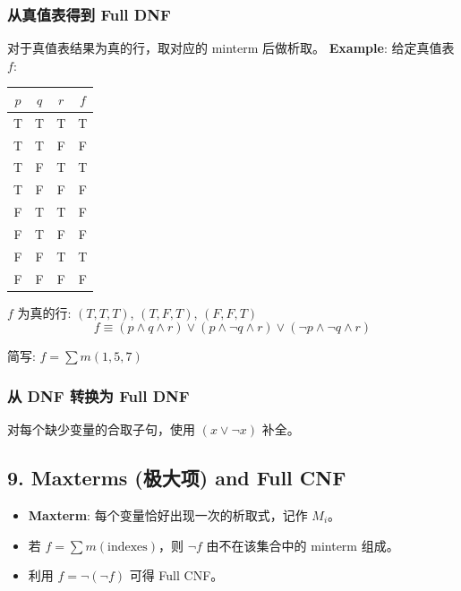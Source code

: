 \documentclass[10pt,a4paper,openany]{ctexbook}
\theoremstyle{definition}
\theoremstyle{remark}
\begin{document}
\subsubsection{从真值表得到 Full DNF}

对于真值表结果为真的行，取对应的 minterm 后做析取。
\textbf{Example}: 给定真值表 $f$:
\begin{center}
\begin{tabular}{cccc}
\hline
$p$ & $q$ & $r$ & $f$ \\ \hline
T & T & T & T \\
T & T & F & F \\
T & F & T & T \\
T & F & F & F \\
F & T & T & F \\
F & T & F & F \\
F & F & T & T \\
F & F & F & F \\
\hline
\end{tabular}

\end{center}

$f$ 为真的行: $(T,T,T)$, $(T,F,T)$, $(F,F,T)$
\[
f \equiv (p \land q \land r) \lor (p \land \neg q \land r) \lor (\neg p \land \neg q \land r)
\]

简写: $f = \sum m(1,5,7)$
\subsubsection{从 DNF 转换为 Full DNF}

对每个缺少变量的合取子句，使用 $(x \lor \neg x)$ 补全。
\vspace{-2pt}

\subsection{9. Maxterms (极大项) and Full CNF}

\begin{itemize}
\item \textbf{Maxterm}: 每个变量恰好出现一次的析取式，记作 $M_i$。
\item 若 $f = \sum m(\text{indexes})$，则 $\neg f$ 由不在该集合中的 minterm 组成。
\item 利用 $f = \neg(\neg f)$ 可得 Full CNF。

\end{itemize}

\vspace{-2pt}
\end{document}
